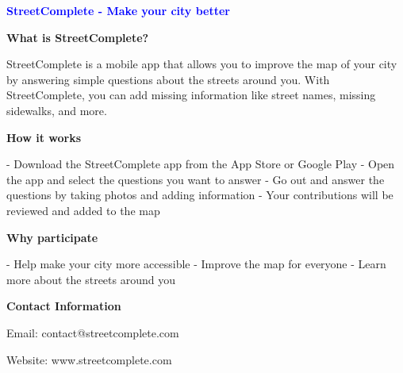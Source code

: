 \documentclass[a5paper]{article}
\begin{document}
\begin{center}


\vspace{1cm}

{\Large\textbf{\textcolor{blue}{StreetComplete - Make your city better}}}

\vspace{0.5cm}

\begin{multicols}{2}
{\large\textbf{What is StreetComplete?}}

StreetComplete is a mobile app that allows you to improve the map of your city by answering simple questions about the streets around you. With StreetComplete, you can add missing information like street names, missing sidewalks, and more.

{\large\textbf{How it works}}

- Download the StreetComplete app from the App Store or Google Play
- Open the app and select the questions you want to answer
- Go out and answer the questions by taking photos and adding information
- Your contributions will be reviewed and added to the map

{\large\textbf{Why participate}}

- Help make your city more accessible
- Improve the map for everyone
- Learn more about the streets around you

{\large\textbf{Contact Information}}

Email: contact@streetcomplete.com

Website: www.streetcomplete.com
\end{multicols}
\end{center}
\end{document}
